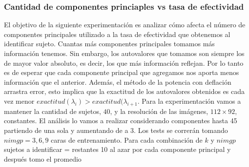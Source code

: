 \subsubsection{Cantidad de componentes princiaples vs tasa de efectividad}
El objetivo de la siguiente experimentación es analizar cómo afecta el número de componentes principales utilizado a la tasa de efectividad
que obtenemos al identificar sujeto. Cuantas más componentes principales tomamos más información tenemos. Sin embargo, los autovalores que tomamos
son siempre los de mayor valor absoluto, es decir, los que más información reflejan. Por lo tanto es de esperar que cada componente principal que agregamos
nos aporta menos información que el anterior. Además, el método de la potencia con deflación arrastra error, esto implica que la exactitud de los autovalores 
obtenidos es cada vez menor $exactitud(\lambda_i) > exactitud(\lambda_{i+1}$.
Para la experimentación vamos a mantener la cantidad de sujetos, $40$, y la resolución de las imágenes, $112 \times 92$, constantes. El análisis lo vamos
a realizar considerando componentes hasta 45 partiendo de una sola y aumentando de a 3. Los tests se correrán tomando $nimgp = 3, 6, 9$ caras de entrenamiento. Para cada
combinación de $k$ y $nimgp$
sujetos a identificar = restantes
10 al azar por cada componente principal y después tomo el promedio
